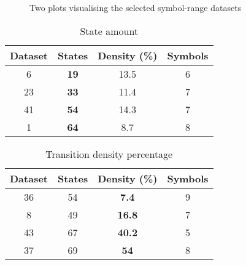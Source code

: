 %

\begin{figure}
	\centering
	\begin{subfigure}[b]{0.5\textwidth}
        \end{subfigure}%
		\begin{subfigure}[b]{0.5\textwidth}

	\end{subfigure}
  	\caption{Two plots visualising the selected symbol-range datasets}\label{fig:symbolsetplot}
\end{figure}

\FloatBarrier

\begin{table}
\centering
{
\begin{tabular}{| c | c | c | c |}
  \hline
  Dataset 	& \textbf{States} 	& Density (\%) 	& Symbols \\  \hline
  6 			& \textbf{19 }			&	13.5				& 6 \\
  23 			& \textbf{33} 			&	11.4				& 7 \\
  41			& \textbf{54} 			&	14.3				& 7 \\
  1				& \textbf{64} 			&	8.7				& 8 \\ \hline
\end{tabular}
\caption{State amount}
\label{state_table}
}
\end{table}

\begin{table}
\centering
{
\begin{tabular}{| c | c | c | c |}
  \hline
  Dataset 	& States  			& \textbf{Density (\%)} 		& Symbols \\  \hline
  36 			&	54					& \textbf{7.4 }						& 9 \\
  8 			&	49					& \textbf{16.8 }					& 7 \\
  43			&	67					& \textbf{40.2 }					& 5 \\
  37			&	69					& \textbf{54 	}					& 8 \\ \hline
\end{tabular}
\caption{Transition density percentage}
\label{density_table}
}
\end{table}

